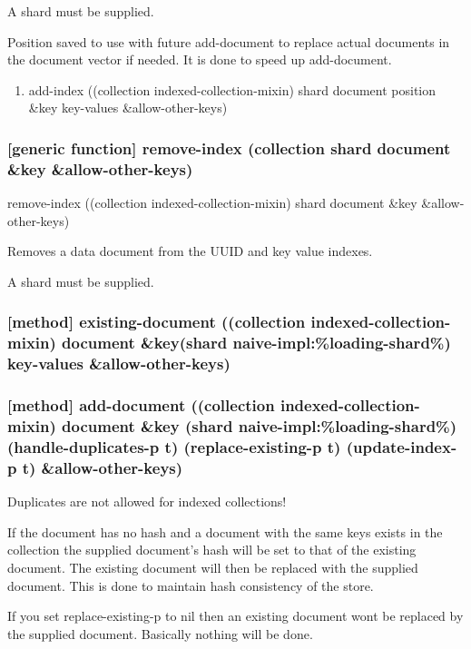 \documentclass[11pt]{article}
\begin{document}
A shard must be supplied.

Position saved to use with future add-document to replace actual
documents in the document vector if needed. It is done to speed up
add-document.

\begin{enumerate}
\item add-index ((collection indexed-collection-mixin) shard document position \&key key-values \&allow-other-keys)
\label{sec:orgba4d437}
\end{enumerate}


\subsubsection{[generic function] remove-index (collection shard document \&key \&allow-other-keys)}
\label{sec:org18127a8}

remove-index ((collection indexed-collection-mixin) shard document \&key \&allow-other-keys)

Removes a data document from the UUID and key value indexes.

A shard must be supplied.

\subsubsection{[method] existing-document ((collection indexed-collection-mixin) document \&key(shard naive-impl:\%loading-shard\%)  key-values \&allow-other-keys)}
\label{sec:org6ae4b34}

\subsubsection{[method] add-document ((collection indexed-collection-mixin) document \&key (shard naive-impl:\%loading-shard\%) (handle-duplicates-p t) (replace-existing-p t) (update-index-p t) \&allow-other-keys)}
\label{sec:orgdc6b083}

Duplicates are not allowed for indexed collections!

If the document has no hash and a document with the same keys exists
in the collection the supplied document's hash will be set to that of
the existing document. The existing document will then be replaced
with the supplied document. This is done to maintain hash consistency
of the store.

If you set replace-existing-p to nil then an existing document wont be
replaced by the supplied document. Basically nothing will be done.
\end{document}
